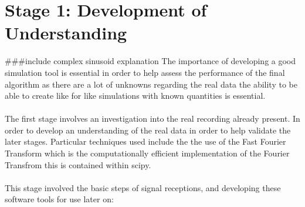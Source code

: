 \section{Stage 1: Development of Understanding} 

###include complex sinusoid explanation
The importance of developing a good simulation tool is essential in order to help assess the performance of the final algorithm as there are a lot of unknowns regarding the real data the ability to be able to create like for like simulations with known quantities is essential.
\\\\
The first stage involves an investigation into the real recording already present. In order to develop an understanding of the real data in order to help validate the later stages. Particular techniques used include the the use of the Fast Fourier Transform which is the computationally efficient implementation of the Fourier Transfrom this is contained within scipy.
\\\\
This stage involved the basic steps of signal receptions, and developing these software tools for use later on:

